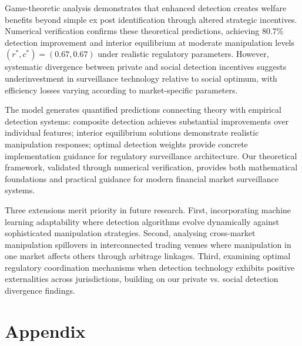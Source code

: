 \documentclass[12pt]{article}
\begin{document}
Game-theoretic analysis demonstrates that enhanced detection creates welfare benefits beyond simple ex post identification through altered strategic incentives. Numerical verification confirms these theoretical predictions, achieving 80.7\% detection improvement and interior equilibrium at moderate manipulation levels $(r^*, c^*) = (0.67, 0.67)$ under realistic regulatory parameters. However, systematic divergence between private and social detection incentives suggests underinvestment in surveillance technology relative to social optimum, with efficiency losses varying according to market-specific parameters.

The model generates quantified predictions connecting theory with empirical detection systems: composite detection achieves substantial improvements over individual features; interior equilibrium solutions demonstrate realistic manipulation responses; optimal detection weights provide concrete implementation guidance for regulatory surveillance architecture. Our theoretical framework, validated through numerical verification, provides both mathematical foundations and practical guidance for modern financial market surveillance systems.

Three extensions merit priority in future research. First, incorporating machine learning adaptability where detection algorithms evolve dynamically against sophisticated manipulation strategies. Second, analysing cross-market manipulation spillovers in interconnected trading venues where manipulation in one market affects others through arbitrage linkages. Third, examining optimal regulatory coordination mechanisms when detection technology exhibits positive externalities across jurisdictions, building on our private vs. social detection divergence findings.




\appendix
\section*{Appendix}
\end{document}
